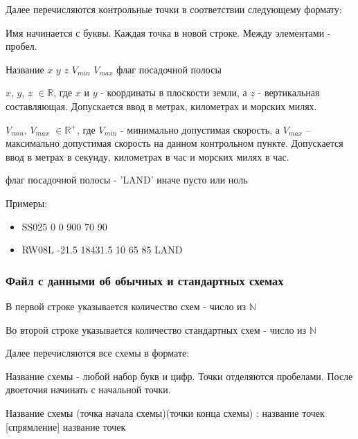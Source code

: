 \documentclass[12pt, a4 paper]{article}
\theoremstyle{plain}
\begin{document}
Далее перечисляются контрольные точки в соответствии следующему формату:

Имя начинается с буквы. Каждая точка в новой строке. Между элементами - пробел.

\bigskip

\begin{center}
Название $x$ $y$ $z$ $V_{min}$ $V_{max}$ флаг посадочной полосы
\end{center}

\bigskip

$x$, $y$, $z$ $\in \mathbb{R}$, где $x$ и $y$ - координаты в плоскости земли, а $z$ - вертикальная составляющая. Допускается ввод в метрах, километрах и морских милях.

$V_{min}$, $V_{max}$ $\in \mathbb{R}^+$, где $V_{min}$ - минимально допустимая скорость, а $V_{max}$ -- максимально допустимая скорость на данном контрольном пункте. Допускается ввод в метрах в секунду, километрах в час и морских милях в час.

флаг посадочной полосы -  'LAND' иначе пусто или ноль

Примеры:

\begin{itemize}
	\item  SS025 0 0 900 70 90
	\item  RW08L -21.5 18431.5 10 	65 85 LAND
\end{itemize}


\subsubsection*{Файл с данными об обычных и стандартных схемах}


В первой строке указывается количество схем - число из $\mathbb{N}$

Во второй строке указывается количество стандартных схем  - число из $\mathbb{N}$

Далее перечисляются все схемы в формате:

Название схемы - любой набор букв и цифр. Точки отделяются пробелами. После двоеточия начинать с начальной точки.

\bigskip

\begin{center}
Название схемы (точка начала схемы)(точки конца схемы) : название точек [спрямление] название точек
\end{center}
\end{document}

